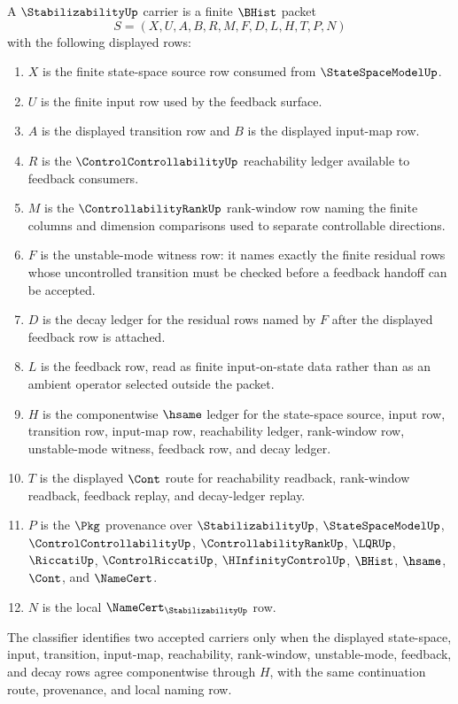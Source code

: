 \begin{definition}
\label{def:stabilizability-carrier}
A $\StabilizabilityUp$ carrier is a finite $\BHist$ packet
$$
S=(X,U,A,B,R,M,F,D,L,H,T,P,N)
$$
with the following displayed rows:
\begin{enumerate}
\item $X$ is the finite state-space source row consumed from $\StateSpaceModelUp$.
\item $U$ is the finite input row used by the feedback surface.
\item $A$ is the displayed transition row and $B$ is the displayed input-map row.
\item $R$ is the $\ControlControllabilityUp$ reachability ledger available to feedback consumers.
\item $M$ is the $\ControllabilityRankUp$ rank-window row naming the finite columns and dimension comparisons used to separate controllable directions.
\item $F$ is the unstable-mode witness row: it names exactly the finite residual rows whose uncontrolled transition must be checked before a feedback handoff can be accepted.
\item $D$ is the decay ledger for the residual rows named by $F$ after the displayed feedback row is attached.
\item $L$ is the feedback row, read as finite input-on-state data rather than as an ambient operator selected outside the packet.
\item $H$ is the componentwise $\hsame$ ledger for the state-space source, input row, transition row, input-map row, reachability ledger, rank-window row, unstable-mode witness, feedback row, and decay ledger.
\item $T$ is the displayed $\Cont$ route for reachability readback, rank-window readback, feedback replay, and decay-ledger replay.
\item $P$ is the $\Pkg$ provenance over $\StabilizabilityUp$, $\StateSpaceModelUp$, $\ControlControllabilityUp$, $\ControllabilityRankUp$, $\LQRUp$, $\RiccatiUp$, $\ControlRiccatiUp$, $\HInfinityControlUp$, $\BHist$, $\hsame$, $\Cont$, and $\NameCert$.
\item $N$ is the local $\NameCert_{\StabilizabilityUp}$ row.
\end{enumerate}
The classifier identifies two accepted carriers only when the displayed state-space, input, transition, input-map, reachability, rank-window, unstable-mode, feedback, and decay rows agree componentwise through $H$, with the same continuation route, provenance, and local naming row.
\end{definition}

